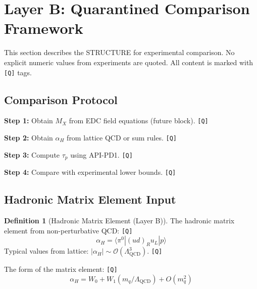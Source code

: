 \documentclass[11pt,a4paper]{article}
\newcommand{\tagQ}{\textcolor{red!70!black}{\texttt{[Q]}}}
\theoremstyle{definition}
\newtheorem{definition}{Definition}[section]
\begin{document}
\section{Layer B: Quarantined Comparison Framework}
\label{sec:layer-b}


\begin{quarantinebox}
This section describes the STRUCTURE for experimental comparison.
No explicit numeric values from experiments are quoted.
All content is marked with \tagQ{} tags.
\end{quarantinebox}

\subsection{Comparison Protocol}
\label{subsec:comparison-protocol}

\textbf{Step 1:} Obtain $M_X$ from EDC field equations (future block). \tagQ{}

\textbf{Step 2:} Obtain $\alpha_H$ from lattice QCD or sum rules. \tagQ{}

\textbf{Step 3:} Compute $\tau_p$ using API-PD1. \tagQ{}

\textbf{Step 4:} Compare with experimental lower bounds. \tagQ{}

\subsection{Hadronic Matrix Element Input}
\label{subsec:alpha-h-input}

\begin{definition}[Hadronic Matrix Element (Layer B)]
\label{def:alpha-h-layerb}
The hadronic matrix element from non-perturbative QCD: \tagQ{}
\begin{equation}
\label{eq:alpha-h-layerb}
\alpha_H = \langle \pi^0 | (ud)_R u_L | p \rangle
\end{equation}
Typical values from lattice: $|\alpha_H| \sim \mathcal{O}(\Lambda_{\text{QCD}}^3)$. \tagQ{}
\end{definition}

The form of the matrix element: \tagQ{}
\begin{equation}
\label{eq:alpha-h-form}
\alpha_H = W_0 + W_1 (m_q/\Lambda_{\text{QCD}}) + O(m_q^2)
\end{equation}
\end{document}
